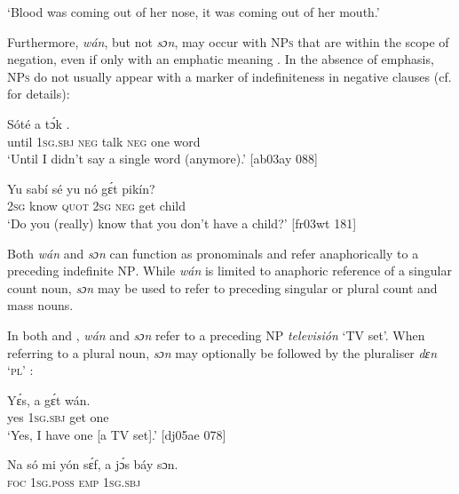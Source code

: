 \glt ‘Blood was coming out of her nose, it was coming out of her mouth.’\textstylePichiexamplenumberZchnZchn{ [ab03ay 125]}
\z

Furthermore, \textit{wán}, but not \textit{sɔn}, may occur with \textsc{NPs} that are within the scope of negation, even if only with an emphatic meaning . In the absence of emphasis, \textsc{NPs} do not usually appear with a marker of indefiniteness in negative clauses  (cf.  for details): 


\ea%
    \label{ex:key:183}
    \gll Sóté    a      tɔ́k        .\\
until  \textsc{1sg.sbj}  \textsc{neg}  talk  \textsc{neg}  one    word\\

\glt ‘Until I didn’t say a single word (anymore).’ [ab03ay 088]
\z


\ea%
    \label{ex:key:184}
    \gll Yu  sabí    sé    yu  nó  gɛ́t  pikín?\\
\textsc{2sg}  know  \textsc{quot}    \textsc{2sg}  \textsc{neg}  get  child\\

\glt ‘Do you (really) know that you don’t have a child?’ [fr03wt 181]
\z

Both \textit{wán} and \textit{sɔn} can function as pronominals and refer anaphorically to a preceding indefinite \textsc{NP}. While \textit{wán} is limited to anaphoric reference of a singular count noun, \textit{sɔn} may be used to refer to preceding singular or plural count and mass nouns. 


In both  and , \textit{wán} and \textit{sɔn} refer to a preceding \textsc{NP} \textit{televisión} ‘TV set’. When referring to a plural noun, \textit{sɔn} may optionally be followed by the pluraliser \textit{dɛn} ‘\textsc{pl}’ : 



\ea%
    \label{ex:key:185}
    \gll Yɛ́s,    a    gɛ́t  wán.\\
yes    \textsc{1sg.sbj}  get  one\\

\glt ‘Yes, I have one [a TV set].’ [dj05ae 078]
\z


\ea%
    \label{ex:key:186}
    \gll Na  só    mi    yón     sɛ́f,  a    jɔ́s  báy  sɔn.\\
\textsc{foc}    \textsc{1sg.poss}   \textsc{emp} \textsc{1sg.sbj}   \\

